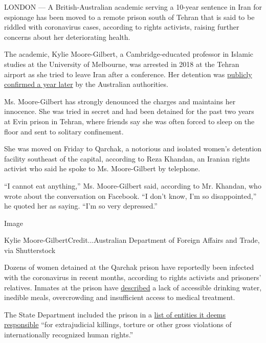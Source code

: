 LONDON --- A British-Australian academic serving a 10-year sentence in
Iran for espionage has been moved to a remote prison south of Tehran
that is said to be riddled with coronavirus cases, according to rights
activists, raising further concerns about her deteriorating health.

The academic, Kylie Moore-Gilbert, a Cambridge-educated professor in
Islamic studies at the University of Melbourne, was arrested in 2018 at
the Tehran airport as she tried to leave Iran after a conference. Her
detention was
\href{https://www.nytimes3xbfgragh.onion/2019/09/11/world/australia/australians-detained-iran.html?rref=collection\%2Fbyline\%2Fmegan-specia\&action=click\&contentCollection=undefined\&region=stream\&module=stream_unit\&version=latest\&contentPlacement=1\&pgtype=collection}{publicly
confirmed a year later} by the Australian authorities.

Ms. Moore-Gilbert has strongly denounced the charges and maintains her
innocence. She was tried in secret and had been detained for the past
two years at Evin prison in Tehran, where friends say she was often
forced to sleep on the floor and sent to solitary confinement.

She was moved on Friday to Qarchak, a notorious and isolated women's
detention facility southeast of the capital, according to Reza Khandan,
an Iranian rights activist who said he spoke to Ms. Moore-Gilbert by
telephone.

``I cannot eat anything,'' Ms. Moore-Gilbert said, according to Mr.
Khandan, who wrote about the conversation on Facebook. ``I don't know,
I'm so disappointed,'' he quoted her as saying. ``I'm so very
depressed.''

Image

Kylie Moore-GilbertCredit...Australian Department of Foreign Affairs and
Trade, via Shutterstock

Dozens of women detained at the Qarchak prison have reportedly been
infected with the coronavirus in recent months, according to rights
activists and prisoners' relatives. Inmates at the prison have
\href{https://iranhumanrights.org/2019/08/prisoners-in-irans-gharchak-prison-for-women-protest-inhumane-living-conditions/}{described}
a lack of accessible drinking water, inedible meals, overcrowding and
insufficient access to medical treatment.

The State Department included the prison in a
\href{https://www.state.gov/report-to-congress-list-of-persons-who-are-responsible-for-or-complicit-in-certain-human-rights-abuses-in-iran/}{list
of entities it deems responsible} ``for extrajudicial killings, torture
or other gross violations of internationally recognized human rights.''

